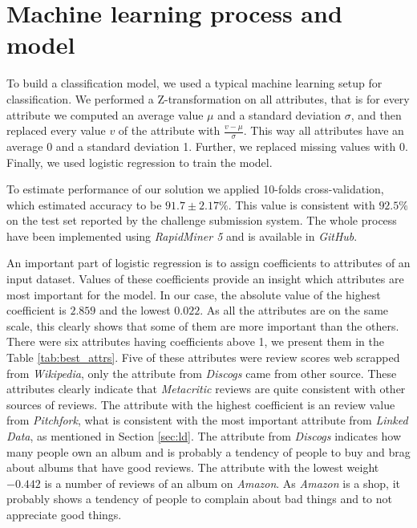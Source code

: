 \documentclass{llncs}
\begin{document}
\section{Machine learning process and model\label{sec:ml}}

To build a classification model, we used a typical machine learning setup for classification.
We performed a Z-transformation on all attributes, that is for every attribute we computed an average value $\mu$ and a standard deviation $\sigma$, and then replaced every value $v$ of the attribute with $\frac{v-\mu}{\sigma}$.
This way all attributes have an average 0 and a standard deviation 1.
Further, we replaced missing values with 0.
Finally, we used logistic regression \cite{logistic_regression} to train the model.

To estimate performance of our solution we applied 10-folds cross-validation, which estimated accuracy to be $91.7\pm 2.17\%$.
This value is consistent with $92.5\%$ on the test set reported by the challenge submission system.
The whole process have been implemented using \emph{RapidMiner 5} and is available in \emph{GitHub}.

An important part of logistic regression is to assign coefficients to attributes of an input dataset.
Values of these coefficients provide an insight which attributes are most important for the model.
In our case, the absolute value of the highest coefficient is $2.859$ and the lowest $0.022$.
As all the attributes are on the same scale, this clearly shows that some of them are more important than the others.
There were six attributes having coefficients above 1, we present them in the Table \ref{tab:best_attrs}.
Five of these attributes were review scores web scrapped from \emph{Wikipedia}, only the attribute from \emph{Discogs} came from other source.
These attributes clearly indicate that \emph{Metacritic} reviews are quite consistent with other sources of reviews.
The attribute with the highest coefficient is an review value from \emph{Pitchfork}, what is consistent with the most important attribute from \emph{Linked Data}, as mentioned in Section \ref{sec:ld}.
The attribute from \emph{Discogs} indicates how many people own an album and is probably a tendency of people to buy and brag about albums that have good reviews.
The attribute with the lowest weight $-0.442$ is a number of reviews of an album on \emph{Amazon}.
As \emph{Amazon} is a shop, it probably shows a tendency of people to complain about bad things and to not appreciate good things.
\end{document}
